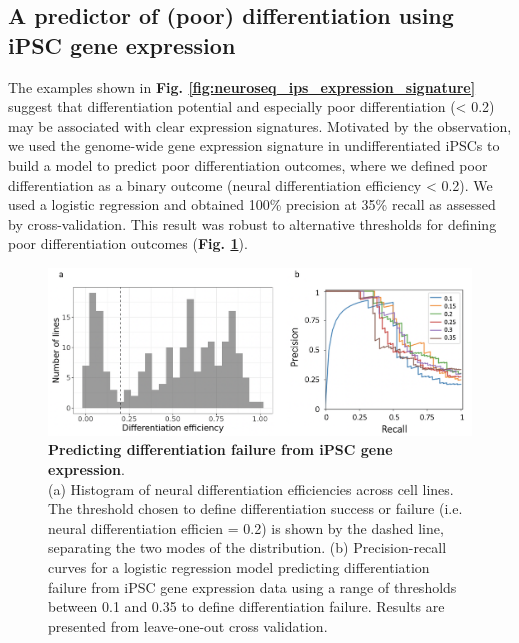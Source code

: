 \newpage

\subsection{A predictor of (poor) differentiation using iPSC gene expression}

The examples shown in \textbf{Fig. \ref{fig:neuroseq_ips_expression_signature}} suggest that differentiation potential and especially poor differentiation (< 0.2) may be associated with clear expression signatures.
Motivated by the observation, we used the genome-wide gene expression signature in undifferentiated iPSCs to build a model to predict poor differentiation outcomes, where we defined poor differentiation as a binary outcome (neural differentiation efficiency < 0.2).
We used a logistic regression and obtained 100\% precision at 35\% recall as assessed by cross-validation. 
This result was robust to alternative thresholds for defining poor differentiation outcomes (\textbf{Fig. \ref{fig:neuroseq_diff_eff_predictor}}). 

\begin{figure}[h]
\centering
\includegraphics[width=15.5cm]{Chapter5/Fig/neuroseq_diff_eff_predict.png}
\caption[Predicting differentiation failure from iPSC gene expression]{\textbf{Predicting differentiation failure from iPSC gene expression}.\\
(a) Histogram of neural differentiation efficiencies across cell lines. 
The threshold chosen to define differentiation success or failure (i.e. neural differentiation efficien = 0.2) is shown by the dashed line, separating the two modes of the distribution. 
(b) Precision-recall curves for a logistic regression model predicting differentiation failure from iPSC gene expression data \cite{cuomo2020single} using a range of thresholds between 0.1 and 0.35 to define differentiation failure. 
Results are presented from leave-one-out cross validation.}
\label{fig:neuroseq_diff_eff_predictor}
\end{figure}

